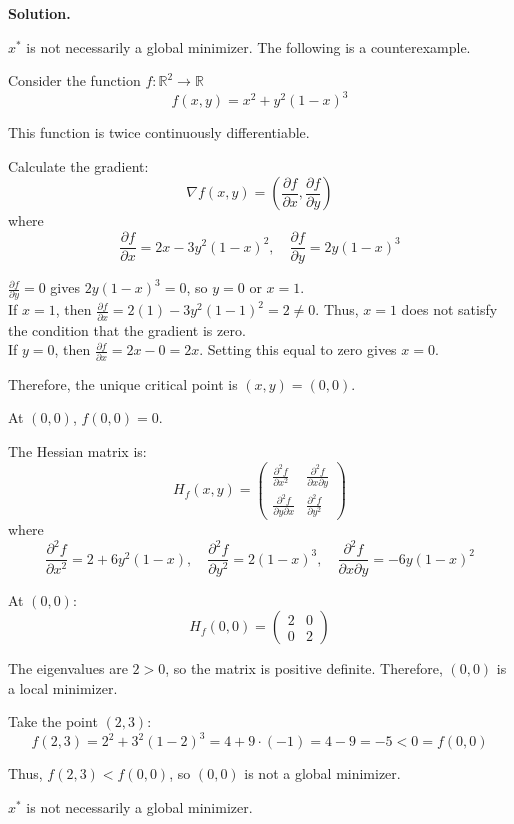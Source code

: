 \documentclass[12pt, a4paper, oneside]{ctexart}
\newenvironment{solution}{\par\noindent\textbf{Solution. }}{\par}
\begin{document}
\begin{solution}
	
$ x^* $ is not necessarily a global minimizer. The following is a counterexample.

Consider the function $ f: \mathbb{R}^2 \to \mathbb{R} $
$$f(x, y) = x^2 + y^2(1 - x)^3$$

This function is twice continuously differentiable.

Calculate the gradient:
$$
\nabla f(x, y) = \left( \frac{\partial f}{\partial x}, \frac{\partial f}{\partial y} \right)
$$
where
$$\frac{\partial f}{\partial x} = 2x - 3y^2(1 - x)^2, \quad \frac{\partial f}{\partial y} = 2y(1 - x)^3
$$

$ \frac{\partial f}{\partial y} = 0 $ gives $ 2y(1 - x)^3 = 0 $, so $ y = 0 $ or $ x = 1 $.\\
If $ x = 1 $, then $ \frac{\partial f}{\partial x} = 2(1) - 3y^2(1 - 1)^2 = 2 \neq 0 $. Thus, $ x = 1 $ does not satisfy the condition that the gradient is zero.\\
If $ y = 0 $, then $ \frac{\partial f}{\partial x} = 2x - 0 = 2x $. Setting this equal to zero gives $ x = 0 $.

Therefore, the unique critical point is $ (x, y) = (0, 0) $.


At $ (0, 0) $, $ f(0, 0) = 0 $.

The Hessian matrix is:
$$
H_f(x, y) = \begin{pmatrix}
	\frac{\partial^2 f}{\partial x^2} & \frac{\partial^2 f}{\partial x \partial y} \\
	\frac{\partial^2 f}{\partial y \partial x} & \frac{\partial^2 f}{\partial y^2}
\end{pmatrix}
$$
where
$$
\frac{\partial^2 f}{\partial x^2} = 2 + 6y^2(1 - x), \quad \frac{\partial^2 f}{\partial y^2} = 2(1 - x)^3, \quad \frac{\partial^2 f}{\partial x \partial y} = -6y(1 - x)^2
$$

At $ (0, 0) $:
$$
H_f(0, 0) = \begin{pmatrix}
	2 & 0 \\
	0 & 2
\end{pmatrix}
$$

The eigenvalues are $ 2 > 0 $, so the matrix is positive definite. Therefore, $ (0, 0) $ is a local minimizer.

Take the point $ (2, 3) $:
$$
f(2, 3) = 2^2 + 3^2(1 - 2)^3 = 4 + 9 \cdot (-1) = 4 - 9 = -5 < 0 = f(0, 0)
$$

Thus, $ f(2, 3) < f(0, 0) $, so $ (0, 0) $ is not a global minimizer.

$ x^* $ is not necessarily a global minimizer.
	
\end{solution}
	
\end{document}

